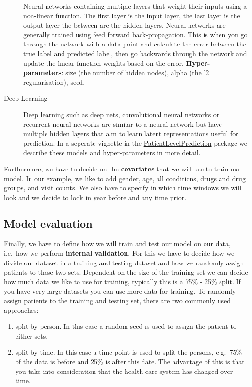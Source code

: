 \documentclass[11pt]{book}
\providecommand{\tightlist}{%
  \setlength{\itemsep}{0pt}\setlength{\parskip}{0pt}}
\begin{document}
\begin{description}
Neural networks containing multiple layers that weight their inputs
using a non-linear function. The first layer is the input layer, the
last layer is the output layer the between are the hidden layers. Neural
networks are generally trained using feed forward back-propagation. This
is when you go through the network with a data-point and calculate the
error between the true label and predicted label, then go backwards
through the network and update the linear function weights based on the
error. \textbf{Hyper-parameters}: size (the number of hidden nodes),
alpha (the l2 regularisation), seed.
\item[Deep Learning]
Deep learning such as deep nets, convolutional neural networks or
recurrent neural networks are similar to a neural network but have
multiple hidden layers that aim to learn latent representations useful
for prediction. In a seperate vignette in the
\href{https://ohdsi.github.io/PatientLevelPrediction/}{PatientLevelPrediction}
package we describe these models and hyper-parameters in more detail.
\end{description}

Furthermore, we have to decide on the \textbf{covariates} that we will
use to train our model. In our example, we like to add gender, age, all
conditions, drugs and drug groups, and visit counts. We also have to
specify in which time windows we will look and we decide to look in year
before and any time prior.

\subsection{Model evaluation}\label{model-evaluation}

Finally, we have to define how we will train and test our model on our
data, i.e.~how we perform \textbf{internal validation}. For this we have
to decide how we divide our dataset in a training and testing dataset
and how we randomly assign patients to these two sets. Dependent on the
size of the training set we can decide how much data we like to use for
training, typically this is a 75\% - 25\% split. If you have very large
datasets you can use more data for training. To randomly assign patients
to the training and testing set, there are two commonly used approaches:

\begin{enumerate}
\def\labelenumi{\arabic{enumi}.}
\tightlist
\item
  split by person. In this case a random seed is used to assign the
  patient to either sets.
\item
  split by time. In this case a time point is used to split the persons,
  e.g.~75\% of the data is before and 25\% is after this date. The
  advantage of this is that you take into consideration that the health
  care system has changed over time.
\end{enumerate}
\end{document}
